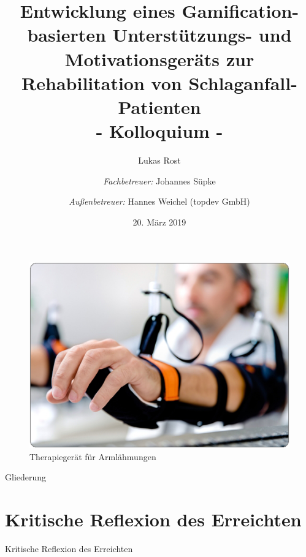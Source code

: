 \documentclass[hyphens]{beamer}
\begin{document}
  \title[Gerät zur Schlaganfall-Rehabilitation]{Entwicklung eines Gamification-basierten Unterstützungs- und Motivationsgeräts zur Rehabilitation von Schlaganfall-Patienten \\ \small{- Kolloquium -}}
  \author[Lukas Rost]{Lukas Rost  \\ \and \emph{Fachbetreuer:} Johannes Süpke \\ \and \emph{Außenbetreuer:} Hannes Weichel (topdev GmbH)}
  \date{20. März 2019}

 \begin{frame}
 \titlepage
 \end{frame}

  \begin{frame}
\begin{figure}
\includegraphics[scale=0.6]{../Themenverteidigung/pics/einleit1}
  \caption{Therapiegerät für Armlähmungen}
\end{figure}
 \end{frame}

 \begin{frame}
 \titlepage
 \end{frame}

 \begin{frame}{Gliederung}
 \tableofcontents
 \end{frame}


 \section{Kritische Reflexion des Erreichten}
 \begin{frame}{Kritische Reflexion des Erreichten}
 \end{frame}
\end{document}
